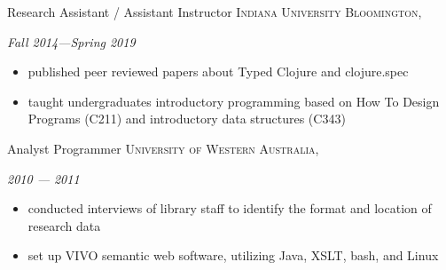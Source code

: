 \documentclass[11pt]{article}
\begin{document}
\headedsection
  {{Research Assistant / Assistant Instructor}}
  {\textsc{Indiana University Bloomington, }} {%
    {\textit{Fall 2014---Spring 2019}}
    {
    \begin{itemize}
      \item published peer reviewed papers about Typed Clojure and clojure.spec
      \item taught undergraduates introductory programming based on How To Design Programs (C211) 
        and introductory data structures (C343)
    \end{itemize}
    }
}



\headedsection
  {Analyst Programmer}
  {\textsc{University of Western Australia, }}
  {%
    {\textit{2010 --- 2011}}
    {
      \begin{itemize}
        \item conducted interviews of library staff to identify
          the format and location of research data
        \item set up VIVO semantic web software, utilizing Java, XSLT,
          bash, and Linux
      \end{itemize}
    }
  }
\end{document}
